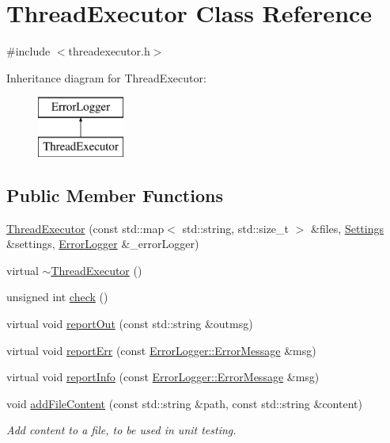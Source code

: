 \hypertarget{class_thread_executor}{\section{Thread\-Executor Class Reference}
\label{class_thread_executor}
}


{\ttfamily \#include $<$threadexecutor.\-h$>$}

Inheritance diagram for Thread\-Executor\-:\begin{figure}[H]
\begin{center}
\leavevmode
\includegraphics[height=2.000000cm]{class_thread_executor}
\end{center}
\end{figure}
\subsection*{Public Member Functions}
\begin{DoxyCompactItemize}
\item 
\hyperlink{class_thread_executor_ae0303363aba4b3c1bb4a86ae4b850f4b}{Thread\-Executor} (const std\-::map$<$ std\-::string, std\-::size\-\_\-t $>$ \&files, \hyperlink{class_settings}{Settings} \&settings, \hyperlink{class_error_logger}{Error\-Logger} \&\-\_\-error\-Logger)
\item 
virtual \hyperlink{class_thread_executor_ae71aa43e461efdd4bc877c5342453ff1}{$\sim$\-Thread\-Executor} ()
\item 
unsigned int \hyperlink{class_thread_executor_a5a4e3d3301981130a55ba2c070dfe482}{check} ()
\item 
virtual void \hyperlink{class_thread_executor_a629882d9c86e2b558ac9ac91b39256ae}{report\-Out} (const std\-::string \&outmsg)
\item 
virtual void \hyperlink{class_thread_executor_a70dfa647ea76e88885b9062d7c4c8b05}{report\-Err} (const \hyperlink{class_error_logger_1_1_error_message}{Error\-Logger\-::\-Error\-Message} \&msg)
\item 
virtual void \hyperlink{class_thread_executor_a7bee346d573c9cc0fb0e63341a5ed6b4}{report\-Info} (const \hyperlink{class_error_logger_1_1_error_message}{Error\-Logger\-::\-Error\-Message} \&msg)
\item 
void \hyperlink{class_thread_executor_a2ed5e6dec3edc7ccbf8edfe42d92a3db}{add\-File\-Content} (const std\-::string \&path, const std\-::string \&content)
\begin{DoxyCompactList}\small\item\em Add content to a file, to be used in unit testing. \end{DoxyCompactList}\end{DoxyCompactItemize}
